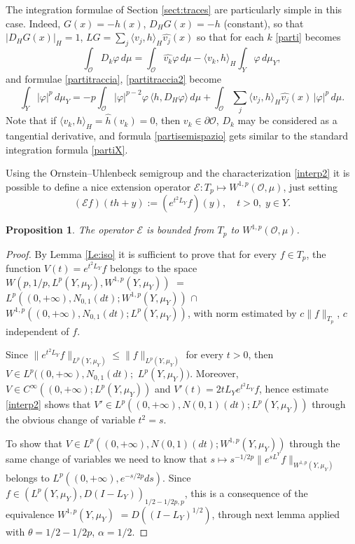 \documentclass[reqno,twoside,12pt]{amsart}
\newtheorem{Proposition}[Theorem]{Proposition}
\begin{document}
\vspace{3mm}

The integration formulae of  Section \ref{sect:traces} are particularly simple in this case. Indeed, $G(x) = -\hat{h}(x)$, $D_HG(x) = -h$ (constant), so that $|D_HG(x)|_H =1$, $LG  =  \sum_{j} \langle v_j, h\rangle_H\hat{v_j}(x)$  so that  for each $k$ \eqref{parti} becomes
\begin{equation}
\label{partisemispazio}
\int_{\mathcal O} D_k\varphi \,d\mu =   \int_{\mathcal O} \hat{v_k}\varphi \,d\mu -  \langle v_k, h\rangle_H \int_{Y}  \varphi \,d \mu_Y ,  
\end{equation}
and formulae \eqref{partitraccia}, \eqref{partitraccia2} become
\begin{equation}
\label{tracciasemispazio}
\int_{Y} | \varphi|^p   \,d \mu_Y  =  -  p  \int_{\mathcal O}  | \varphi|^{p-2}\varphi \, \langle   h, D_H\varphi \rangle \,d\mu +  \int_{\mathcal O} \sum_{j}  \langle v_j, h\rangle_H\hat{v_j}(x)\,| \varphi|^p \,d\mu . 
\end{equation}
Note that  if  $\langle v_k, h\rangle_H = \hat{h}(v_k)= 0$, then $v_k\in \partial {\mathcal O}$, $D_k$ may be considered as a tangential derivative, and formula \eqref{partisemispazio} gets similar  to the standard integration formula \eqref{partiX}. 

\vspace{3mm}

Using the Ornstein--Uhlenbeck semigroup and the characterization  \eqref{interp2} it is possible to define a nice extension operator ${\mathcal E }: T_p\mapsto W^{1,p}({\mathcal O}, \mu)$, just setting
  $$({\mathcal E }f)(th+y) := (e^{t^2L_Y}f)(y), \quad t>0, \;y\in Y.$$
 
\begin{Proposition}
The operator ${\mathcal E }$ is bounded from $T_p$ to $W^{1,p}({\mathcal O}, \mu)$. 
\end{Proposition}
\begin{proof}
By Lemma \ref{Le:iso} it is sufficient to prove that for every $f\in T_p$, the function $V(t) = e^{t^2L_Y}f$ belongs to the space $W(p, 1/p,  L^p(Y, \mu_Y),W^{1,p}(Y, \mu_Y))$ $=$
$L^p((0, +\infty),  N_{0,1}(dt);W^{1,p}(Y, \mu_Y))$ $\cap$ $W^{1,p}  ((0, +\infty), N_{0,1}(dt);L^p(Y, \mu_Y))$, with norm estimated by $c\|f\|_{T_p}$, $c$ independent of $f$. 

Since $\|e^{t^2L_Y}f\|_{L^p(Y, \mu_Y)} \leq \|f\|_{L^p(Y, \mu_Y)}$ for every $t > 0$, then $V\in L^{p}  ((0, +\infty), N_{0,1}(dt);$ $ L^p(Y, \mu_Y))$. Moreover,  
$V\in C^{\infty}((0, +\infty);L^p(Y, \mu_Y))$ and $V'(t) = 2t L_Ye^{t^2L_Y}f$, hence estimate \eqref{interp2} shows that $V'\in L^p((0, +\infty), N(0,1)(dt); L^p(Y, \mu_Y))$ through the obvious change of variable $t^2=s$. 

To show that $V\in L^p((0, +\infty), N(0,1)(dt); W^{1,p}(Y, \mu_Y))$ through the same change of variables we need to know that $s\mapsto s^{-1/2p}\|e^{sL^Y}f\|_{W^{1,p}(Y, \mu_Y)}$ belongs to $L^p((0, +\infty), e^{-s/2p}ds)$. Since $f\in (L^{p}(Y,  \mu_Y), D(I-L_Y))_{1/2-1/2p, p}$, this is a consequence of  the equivalence $W^{1,p}(Y, \mu_Y)$ $ = D((I-L_Y)^{1/2})$, through next lemma applied with $\theta = 1/2 - 1/2p$, $\alpha = 1/2$. 
\end{proof}
 
\end{document}
